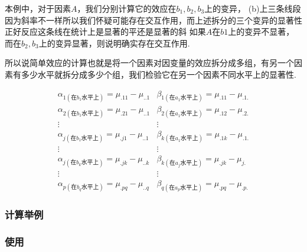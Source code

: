 本例中，对于因素$A$，我们分别计算它的效应在$b_1,b_2,b_3$上的变异，
(b)上三条线段因为斜率不一样所以我们怀疑可能存在交互作用，而上述拆分的三个变异的显著性正好反应这条线在统计上是显著的平还是显著的斜
如果$A$在$b1$上的变异不显著，而在$b_2,b_3$上的变异显著，则说明确实存在交互作用.

所以说简单效应的计算也就是将一个因素对因变量的效应拆分成多组，有另一个因素有多少水平就拆分成多少个组，我们检验它在另一个因素不同水平上的显著性.

\[\begin{array}{cc}
    \alpha _{1\left( \text{在}b_1\text{水平上} \right)} = \mu _{.11} - \mu _{..1} & \beta _{1\left( \text{在}a_1\text{水平上} \right)} = \mu _{.11} - \mu _{.1.}\\
    \alpha _{2\left( \text{在}b_1\text{水平上} \right)} = \mu _{.21} - \mu _{..1}& \beta _{2\left( \text{在}a_1\text{水平上} \right)} = \mu _{.12} - \mu _{.2.}\\
    \vdots                                              & \vdots\\
    \alpha _{j\left( \text{在}b_1\text{水平上} \right)} = \mu _{.j1} - \mu _{..1}&\beta _{k\left( \text{在}a_1\text{水平上} \right)}= \mu _{.1k} - \mu _{.1.}\\
    \vdots                                              & \vdots\\
    \alpha _{j\left( \text{在}b_k\text{水平上} \right)} = \mu _{.jk} - \mu _{..k}& \beta _{k\left( \text{在}a_j\text{水平上} \right)}= \mu _{.jk} - \mu _{j.}\\
    \vdots                                              & \vdots\\
    \alpha _{p\left( \text{在}b_q\text{水平上} \right)} = \mu _{.pq} - \mu _{..q}& \beta _{q\left( \text{在}a_p\text{水平上} \right)}= \mu _{.pq} - \mu _{.p.}
\end{array}\]




\subsubsection{计算举例}


\subsubsection{使用}




